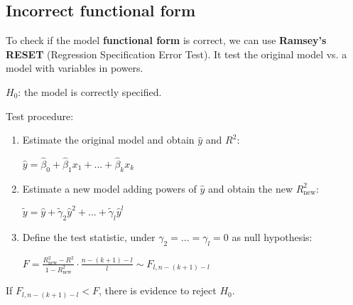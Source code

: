 \documentclass[10pt, a4paper, landscape]{extarticle}
\begin{document}
\begin{multicols}{3}
\section*{Incorrect functional form}
	To check if the model \textbf{functional form} is correct, we can use \textbf{Ramsey's RESET} (Regression Specification Error Test). It test the original model vs. a model with variables in powers.
	\begin{center}
		$H_0$: the model is correctly specified.
	\end{center}
	Test procedure:
	\begin{enumerate}[leftmargin=*]
		\item Estimate the original model and obtain $\hat{y}$ and $R^2$:
		\begin{center}
			$\hat{y} = \hat{\beta}_0 + \hat{\beta}_1 x_1 + ... + \hat{\beta}_k x_k$
		\end{center}
		\item Estimate a new model adding powers of $\hat{y}$ and obtain the new $R^2_{\mathrm{new}}$:
		\begin{center}
			$\tilde{y} = \hat{y} + \tilde{\gamma}_2 \hat{y}^2 + ... + \tilde{\gamma}_l \hat{y}^l$
		\end{center}
		\item Define the test statistic, under $\gamma_2 = ... = \gamma_l = 0$ as null hypothesis:
		\begin{center}
			$F = \frac{R^2_{\mathrm{new}} - R^2}{1 - R^2_{\mathrm{new}}} \cdot \frac{n-(k+1)-l}{l} \sim F_{l, n-(k+1)-l}$
		\end{center}
	\end{enumerate}
	If $F_{l, n-(k+1)-l} < F$, there is evidence to reject $H_0$.


\end{multicols}
\end{document}
